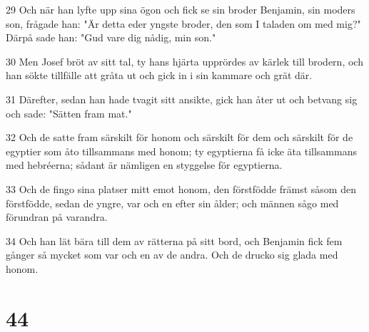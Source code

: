 \par 29 Och när han lyfte upp sina ögon och fick se sin broder Benjamin, sin moders son, frågade han: "Är detta eder yngste broder, den som I taladen om med mig?" Därpå sade han: "Gud vare dig nådig, min son."
\par 30 Men Josef bröt av sitt tal, ty hans hjärta upprördes av kärlek till brodern, och han sökte tillfälle att gråta ut och gick in i sin kammare och grät där.
\par 31 Därefter, sedan han hade tvagit sitt ansikte, gick han åter ut och betvang sig och sade: "Sätten fram mat."
\par 32 Och de satte fram särskilt för honom och särskilt för dem och särskilt för de egyptier som åto tillsammans med honom; ty egyptierna få icke äta tillsammans med hebréerna; sådant är nämligen en styggelse för egyptierna.
\par 33 Och de fingo sina platser mitt emot honom, den förstfödde främst såsom den förstfödde, sedan de yngre, var och en efter sin ålder; och männen sågo med förundran på varandra.
\par 34 Och han lät bära till dem av rätterna på sitt bord, och Benjamin fick fem gånger så mycket som var och en av de andra. Och de drucko sig glada med honom.

\chapter{44}

